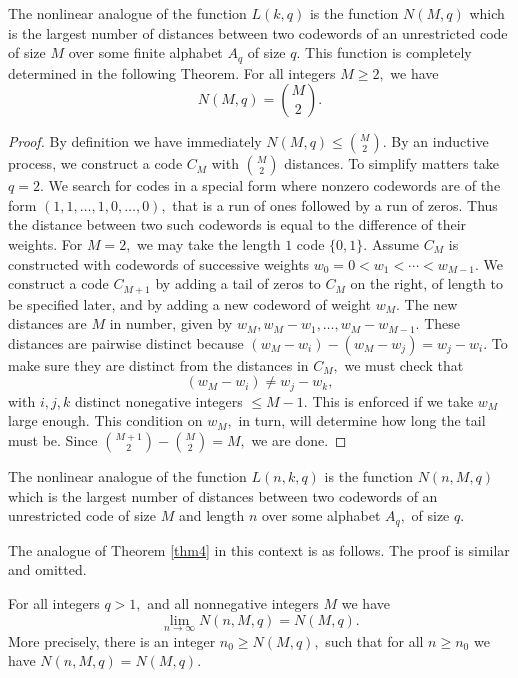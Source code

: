 \documentclass[12pt]{article}
\theoremstyle{definition}
\begin{document}
The nonlinear analogue of the function $L(k,q)$ is the function $N(M,q)$ which is the largest number of distances between two codewords of an unrestricted code of size $M$ over
some finite alphabet $A_q$ of size $q.$
This function is completely determined in the following Theorem.
{\theorem \label{tight2} For all integers $M\ge 2,$ we have
$$N(M,q)={M \choose 2}.$$ }\vspace{-0.8cm}
\begin{proof}
By definition we have immediately $N(M,q)\le{M \choose 2}.$ By an inductive process, we construct a code $C_M$ with ${M \choose 2}$ distances. To simplify matters take $q=2.$
We search for codes in a special form where nonzero codewords are of the form $(1,1,\dots,1,0,\dots,0),$ that is a run of ones followed by a run of zeros. Thus the distance between two such codewords is equal to the difference of their weights. For $M=2,$ we may take the length $1$ code $\{0,1\}.$
Assume $C_M$ is constructed with codewords of successive weights $w_0=0<w_1<\cdots<w_{M-1}.$ We construct a code $C_{M+1}$ by adding a tail of zeros to $C_M$ on the right, of length to be specified later, and by adding a new codeword of weight $w_M.$ The new distances are $M$ in number, given by
$w_M, w_M-w_1,\dots,w_M-w_{M-1}.$ These distances are pairwise distinct because $(w_M-w_i)-(w_M-w_j)=w_j-w_i.$ To make sure they are distinct from the distances in $C_M,$ we must check that
$$ (w_M-w_i)\neq w_j-w_k,$$ with $i,j,k$ distinct nonegative integers $\le M-1.$ This is enforced if we take $w_M$ large enough. This condition on $w_M,$ in turn, will determine how long the tail must be.
Since ${{M+1} \choose 2}-{M \choose 2}=M,$   we are done.
\end{proof}

The nonlinear analogue of the function $L(n,k,q)$ is the function $N(n,M,q)$ which is the largest number of distances between two codewords of an unrestricted code of size $M$
and length $n$ over some alphabet $A_q,$ of size $q.$



The analogue of Theorem \ref{thm4} in this context is as follows. The proof is similar and omitted.

{\theorem For all integers $q>1,$ and all nonnegative integers $M$ we have
$$\lim_{n \rightarrow \infty }N(n,M,q)=N(M,q).$$
More precisely, there is an integer $n_0\ge N(M,q),$ such that for all $n\ge n_0$ we have $N(n,M,q)=N(M,q).$
}\\
\end{document}
